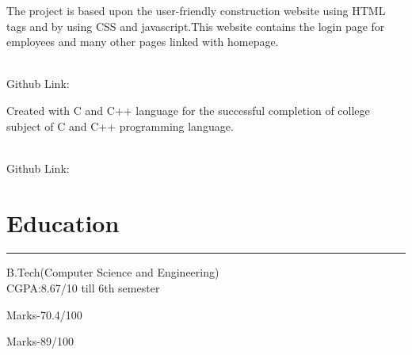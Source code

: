 \documentclass[]{vishal-kathpalia}
\begin{document}
\begin{minipage}[t]{0.66\textwidth}
\datecolor{} 
\noindent
\hspace{0em}%
\begin{minipage}{0.95\textwidth\vspace{2pt}}
The project is based upon the user-friendly construction website using HTML tags and by using CSS and javascript.This website contains the login page for employees and many other pages linked with homepage.
\end{minipage}
\\
Github Link: \href{https://github.com/Er-Vishal-Kathpalia/HTML_CSS}{}\\
\sectionsep

\datecolor{} 
\noindent
\hspace{0em}%
\begin{minipage}{0.95\textwidth\vspace{2pt}}
Created with C and C++ language for the successful completion of college subject of C and C++ programming language.
\end{minipage}
\\
Github Link: \href{https://github.com/Er-Vishal-Kathpalia/Library_Managment_System}{}\\

\section{Education} 
\noindent\rule{12.5cm}{0.4pt}
 
\noindent
\hspace{5em}%
\begin{minipage}{0.85\textwidth\vspace{2pt}}
B.Tech(Computer Science and Engineering)\\
CGPA:8.67/10 till 6th semester
\end{minipage}
 
\noindent
\hspace{5em}%
\begin{minipage}{0.85\textwidth\vspace{2pt}}
Marks-70.4/100%
\end{minipage}
 
\noindent
\hspace{5em}%
\begin{minipage}{0.85\textwidth\vspace{2pt}}
Marks-89/100%
\end{minipage}

\end{minipage}
\end{document}
